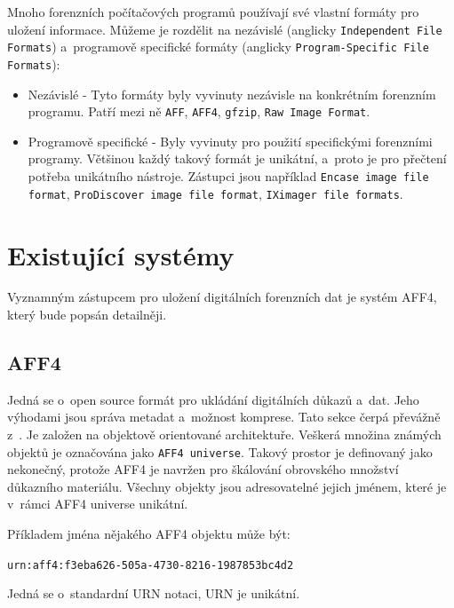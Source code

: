Mnoho forenzních počítačových programů používají své vlastní formáty pro uložení informace. Můžeme je rozdělit na nezávislé (anglicky \texttt{Independent File Formats}) a~programově specifické formáty (anglicky \texttt{Program-Specific File Formats}):

\begin{itemize}
\item Nezávislé - Tyto formáty byly vyvinuty nezávisle na konkrétním forenzním programu. Patří mezi ně \texttt{AFF}, \texttt{AFF4}, \texttt{gfzip}, \texttt{Raw Image Format}.

\item Programově specifické - Byly vyvinuty pro použití specifickými forenzními programy. Většinou každý takový formát je unikátní, a~proto je pro přečtení potřeba unikátního nástroje.
Zástupci jsou například \texttt{Encase image file format}, \texttt{ProDiscover image file format}, \texttt{IXimager file formats}.
\end{itemize}

\section{Existující systémy}
Vyznamným zástupcem pro uložení digitálních forenzních dat je systém AFF4, který bude popsán detailněji.

\subsection{AFF4}
Jedná se o~open source formát pro ukládání digitálních důkazů a~dat. Jeho výhodami jsou správa metadat a~možnost komprese. Tato sekce čerpá převážně z~\cite{aff4}. Je založen na objektově orientované architektuře. Veškerá množina známých objektů je označována jako \texttt{AFF4 universe}. Takový prostor je definovaný jako nekonečný, protože AFF4 je navržen pro škálování obrovského množství důkazního materiálu. Všechny objekty jsou adresovatelné jejich jménem, které je v~rámci AFF4 universe unikátní.

\vspace{0.5cm}

\noindent Příkladem jména nějakého AFF4 objektu může být:

\texttt{urn:aff4:f3eba626-505a-4730-8216-1987853bc4d2}

\noindent Jedná se o~standardní URN notaci, URN je unikátní.

\vspace{0.5cm}


